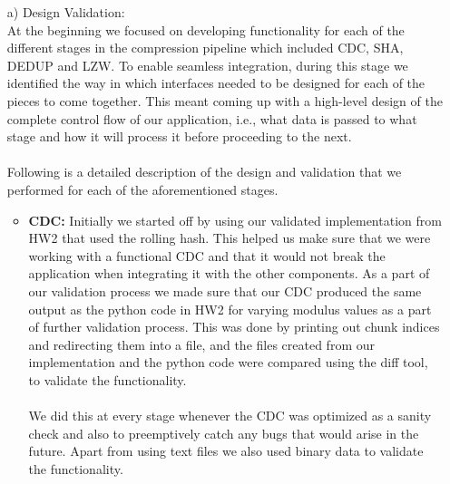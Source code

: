 \documentclass[../main.tex]{subfiles}
\begin{document}
\begin{enumerate}
    \item[a)] Design Validation: \\
    At the beginning we focused on developing functionality for each of the different stages in the compression pipeline which included CDC, SHA, DEDUP and LZW. To enable seamless integration, during this stage we identified the way in which interfaces needed to be designed for each of the pieces to come together. This meant coming up with a high-level design of the complete control flow of our application, i.e., what data is passed to what stage and how it will process it before proceeding to the next. \\ \\
    Following is a detailed description of the design and validation that we performed for each of the aforementioned stages.
    \begin{itemize}
        \item \textbf{CDC:} Initially we started off by using our validated implementation from HW2 that used the rolling hash. This helped us make sure that we were working with a functional CDC and that it would not break the application when integrating it with the other components. As a part of our validation process we made sure that our CDC produced the same output as the python code in HW2 for varying modulus values as a part of further validation process. This was done by printing out chunk indices and redirecting them into a file, and the files created from our implementation and the python code were compared using the diff tool, to validate the functionality. \\ \\
        We did this at every stage whenever the CDC was optimized as a sanity check and also to preemptively catch any bugs that would arise in the future. Apart from using text files we also used binary data to validate the functionality. \\


\end{itemize}
\end{enumerate}
\end{document}

